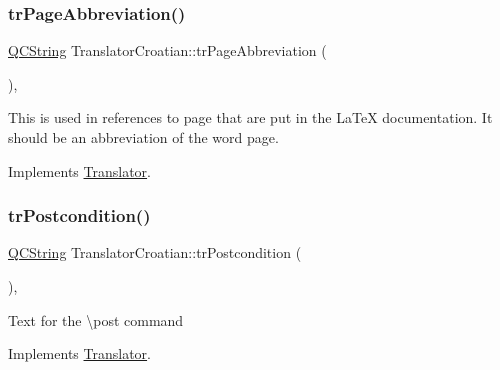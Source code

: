 \mbox{\label{class_translator_croatian_aba7b83dec5ef1b4b4f2286bfe543158a}} 
\subsubsection{\texorpdfstring{trPageAbbreviation()}{trPageAbbreviation()}}
{\footnotesize\ttfamily \mbox{\hyperlink{class_q_c_string}{Q\+C\+String}} Translator\+Croatian\+::tr\+Page\+Abbreviation (\begin{DoxyParamCaption}{ }\end{DoxyParamCaption})\hspace{0.3cm}{\ttfamily [inline]}, {\ttfamily [virtual]}}

This is used in references to page that are put in the La\+TeX documentation. It should be an abbreviation of the word page. 

Implements \mbox{\hyperlink{class_translator}{Translator}}.

\mbox{\label{class_translator_croatian_a96f1eb4be405b042e408112bf8d84dfc}} 
\subsubsection{\texorpdfstring{trPostcondition()}{trPostcondition()}}
{\footnotesize\ttfamily \mbox{\hyperlink{class_q_c_string}{Q\+C\+String}} Translator\+Croatian\+::tr\+Postcondition (\begin{DoxyParamCaption}{ }\end{DoxyParamCaption})\hspace{0.3cm}{\ttfamily [inline]}, {\ttfamily [virtual]}}

Text for the \textbackslash{}post command 

Implements \mbox{\hyperlink{class_translator}{Translator}}.

\mbox{\label{class_translator_croatian_ad2097218c31987550d49fc15ea24105a}} 
